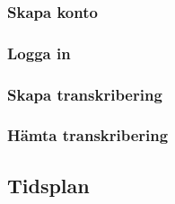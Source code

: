 \subsubsection{Skapa konto}

\subsubsection{Logga in}

\subsubsection{Skapa transkribering}

\subsubsection{Hämta transkribering}

\subsection{Tidsplan}
